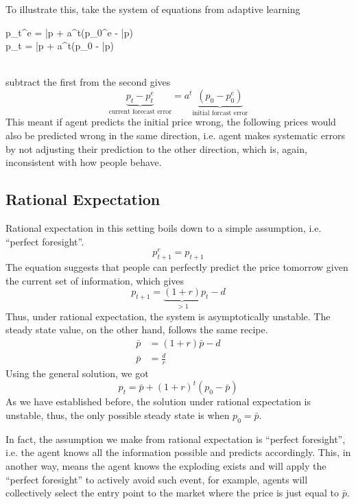 \documentclass[twocolumn, fleqn]{article}
\begin{document}
				To illustrate this, take the system of equations from adaptive learning\\[4pt]
				\begin{cases}
					p_t^e = \bar{p} + a^t(p_0^e - \bar{p})\\
					p_t = \bar{p} + a^t(p_0 - \bar{p})
				\end{cases}\\[4pt]
				subtract the first from the second gives
				\begin{equation*}
					\underbrace{p_t - p_t^e}_{\text{current forecast error}} = a^t \underbrace{(p_0-p_0^e)}_{
						\text{initial
						forcast error}}
				\end{equation*}
				This meant if agent predicts the initial price wrong, the following prices would also be predicted wrong in the same direction, i.e. agent makes systematic errors by not adjusting their prediction to the other direction, which is, again, inconsistent with how people behave.

		\subsection{Rational Expectation}

			Rational expectation in this setting boils down to a simple assumption, i.e. ``perfect foresight''.
			\begin{equation*}
				p_{t+1}^e = p_{t+1}
			\end{equation*}
			The equation suggests that people can perfectly predict the price tomorrow given the current set of
			information, which gives
			\begin{equation*}
				p_{t+1} = \underbrace{(1+r)}_{>1}p_t -d
			\end{equation*}
			Thus, under rational expectation, the system is asymptotically unstable.
			The steady state value, on the other hand, follows the same recipe.
			\begin{align*}
				\bar{p} &= (1+r)\bar{p}-d\\
				\bar{p} &= \frac{d}{r}
			\end{align*}
			Using the general solution, we got
			\begin{equation*}
				p_t = \bar{p} + (1+r)^t(p_0-\bar{p})
			\end{equation*}
			As we have established before, the solution under rational expectation is unstable, thus, the only
			possible steady state is when $p_0=\bar{p}$.

			In fact, the assumption we make from rational expectation is ``perfect foresight'', i.e. the agent knows all the information possible and predicts accordingly.
			This, in another way, means the agent knows the exploding exists and will apply the ``perfect
			foresight'' to actively avoid such event, for example, agents will collectively select the entry point to the market where the price is just equal to $\bar{p}$.
\end{document}
